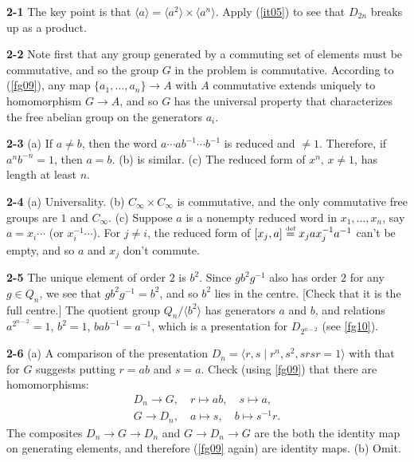 \documentclass[a4paper,11pt,final,openany]{memoir}%
\theoremstyle{nonumberplain}
\begin{document}
\bigskip\noindent\textbf{2-1}
The key point is that $\langle a\rangle=\langle a^{2}\rangle\times\langle
a^{n}\rangle$. Apply (\ref{it05}) to see that $D_{2n}$ breaks up as a product.

\bigskip\noindent\textbf{2-2}
Note first that any group generated by a commuting set of elements must be
commutative, and so the group $G$ in the problem is commutative. According to
(\ref{fg09}), any map $\{a_{1},\ldots,a_{n}\}\rightarrow A$ with $A$
commutative extends uniquely to homomorphism $G\rightarrow A$, and so $G$ has
the universal property that characterizes the free abelian group on the
generators $a_{i}$.

\bigskip\noindent\textbf{2-3}
(a) If $a\neq b$, then the word $a\cdots ab^{-1}\cdots b^{-1}$ is reduced and
$\neq1$. Therefore, if $a^{n}b^{-n}=1$, then $a=b$. (b) is similar. (c) The
reduced form of $x^{n}$, $x\neq1$, has length at least $n$.

\bigskip\noindent\textbf{2-4}
(a) Universality. (b) $C_{\infty}\times C_{\infty}$ is commutative, and the
only commutative free groups are $1$ and $C_{\infty}$. (c) Suppose $a$ is a
nonempty reduced word in $x_{1},\ldots,x_{n}$, say $a=x_{i}\cdots$ (or
$x_{i}^{-1}\cdots$). For $j\neq i$, the reduced form of $[x_{j},a]\overset
{\text{{\tiny def}}}{=}x_{j}ax_{j}^{-1}a^{-1}$ can't be empty, and so $a$ and
$x_{j}$ don't commute.

\bigskip\noindent\textbf{2-5}
The unique element of order $2$ is $b^{2}$. Since $gb^{2}g^{-1}$ also has
order $2$ for any $g\in Q_{n}$, we see that $gb^{2}g^{-1}=b^{2}$, and so
$b^{2}$ lies in the centre. [Check that it is the full centre.] The quotient
group $Q_{n}/\langle b^{2}\rangle$ has generators $a$ and $b$, and relations
$a^{2^{n-2}}=1$, $b^{2}=1$, $bab^{-1}=a^{-1}$, which is a presentation for
$D_{2^{n-2}}$ (see \ref{fg10}).

\bigskip\noindent\textbf{2-6}
(a) A comparison of the presentation $D_{n}=\langle r,s\mid r^{n}%
,s^{2},srsr=1\rangle$ with that for $G$ suggests putting $r=ab$ and $s=a$.
Check (using \ref{fg09}) that there are homomorphisms:
\begin{align*}
D_{n}\rightarrow G,\quad r\mapsto ab,\quad s\mapsto a,\\
 G\rightarrow
D_{n},\quad a\mapsto s,\quad b\mapsto s^{-1}r\text{.}%
\end{align*}
The composites $D_{n}\rightarrow G\rightarrow D_{n}$ and $G\rightarrow
D_{n}\rightarrow G$ are the both the identity map on generating elements, and
therefore (\ref{fg09} again) are identity maps. (b) Omit.
\end{document}
